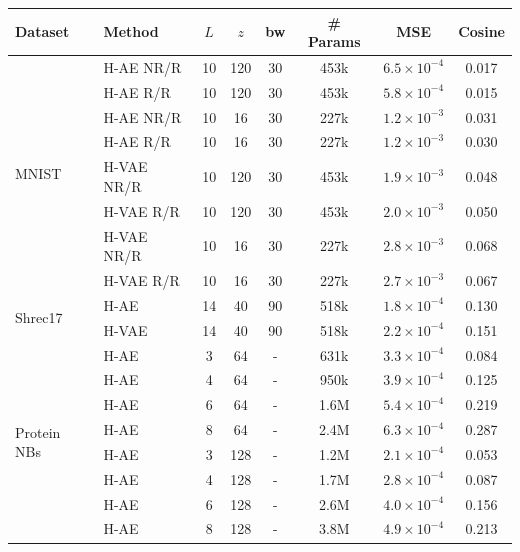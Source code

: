 \begin{table}[ht]
\begin{center}
\begin{tabular}{l l c c c c | c c}
    \bf Dataset & \bf Method & \bf $L$ & \bf $z$ & \bf bw & \bf \# Params & \bf MSE & \bf Cosine \\
    \hline
    \hline
    \multirow{8}{*}{MNIST}
    & H-AE NR/R     & 10 & 120 & 30 & 453k & $6.5 \times 10^{-4}$ & 0.017
    \\
    & H-AE R/R      & 10 & 120 & 30 & 453k & $5.8 \times 10^{-4}$ & 0.015
    \\
    & H-AE NR/R     & 10 &  16 & 30 & 227k & $1.2 \times 10^{-3}$ & 0.031
    \\
    & H-AE R/R      & 10 &  16 & 30 & 227k & $1.2 \times 10^{-3}$ & 0.030
    \\
    & H-VAE NR/R    & 10 & 120 & 30 & 453k & $1.9 \times 10^{-3}$ & 0.048
    \\
    & H-VAE R/R     & 10 & 120 & 30 & 453k & $2.0 \times 10^{-3}$ & 0.050
    \\
    & H-VAE NR/R    & 10 &  16 & 30 & 227k & $2.8 \times 10^{-3}$ & 0.068
    \\
    & H-VAE R/R     & 10 &  16 & 30 & 227k & $2.7 \times 10^{-3}$ & 0.067
    \\
    \hline
    \multirow{2}{*}{Shrec17}
    & H-AE          & 14 &  40 & 90 & 518k & $1.8 \times 10^{-4}$ & 0.130 \\
    & H-VAE         & 14 &  40 & 90 & 518k & $2.2 \times 10^{-4}$ & 0.151 \\
    \hline
    \multirow{12}{*}{Protein NBs}
    & H-AE          &  3 &  64 & - & 631k & $3.3 \times 10^{-4}$ & 0.084 \\
    & H-AE          &  4 &  64 & - & 950k & $3.9 \times 10^{-4}$ & 0.125 \\
    & H-AE          &  6 &  64 & - & 1.6M & $5.4 \times 10^{-4}$ & 0.219 \\
    & H-AE          &  8 &  64 & - & 2.4M & $6.3 \times 10^{-4}$ & 0.287 \\
    \cline{2-8}
    & H-AE          &  3 & 128 & - & 1.2M & $2.1 \times 10^{-4}$ & 0.053 \\
    & H-AE          &  4 & 128 & - & 1.7M & $2.8 \times 10^{-4}$ & 0.087 \\
    & H-AE          &  6 & 128 & - & 2.6M & $4.0 \times 10^{-4}$ & 0.156 \\
    & H-AE          &  8 & 128 & - & 3.8M & $4.9 \times 10^{-4}$ & 0.213 \\

\end{tabular}
\end{center}
\end{table}
